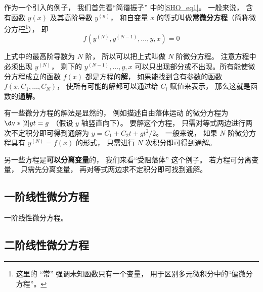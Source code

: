 
\begin{issues}
\issueDraft
\end{issues}


作为一个引入的例子， 我们首先看“简谐振子” 中的\autoref{SHO_eq1}。 一般来说， 含有函数 $y(x)$ 及其高阶导数 $y^{(n)}$， 和自变量 $x$ 的等式叫做\textbf{常微分方程}（简称微分方程\footnote{这里的 “常” 强调未知函数只有一个变量， 用于区别多元微积分中的“偏微分方程”。}）， 即
\begin{equation}
f(y^{(N)}, y^{(N-1)}, \dots, y, x) = 0
\end{equation}

上式中的最高阶导数为 $N$ 阶， 所以可以把上式叫做 $N$ 阶微分方程。 注意方程中必须出现 $y^{(N)}$， 剩下的 $y^{(N-1)}, \dots, y, x$ 可以只出现部分或不出现。所有能使微分方程成立的函数 $f(x)$ 都是方程的\textbf{解}， 如果能找到含有参数的函数 $f(x,C_1, \dots , C_N)$， 使所有可能的解都可以通过给 $C_i$ 赋值来表示， 那么这就是函数的\textbf{通解}。

有一些微分方程的解法是显然的， 例如描述自由落体运动 的微分方程为 $\dv*[2]{y}{t} = g$ （假设 $y$ 轴竖直向下）。 要解这个方程， 只需对等式两边进行两次不定积分即可得到通解为 $y = C_1 + C_2 t + gt^2/2$。 一般来说， 如果 $N$ 阶微分方程具有 $y^{(N)} = f(x)$ 的形式， 只需进行 $N$ 次积分即可得到通解。

另一些方程是\textbf{可以分离变量}的， 我们来看“受阻落体” 这个例子。 若方程可分离变量， 只需先分离变量， 再对等式两边求不定积分即可找到通解。



\subsection{一阶线性微分方程}
一阶线性微分方程。

\subsection{二阶线性微分方程}

